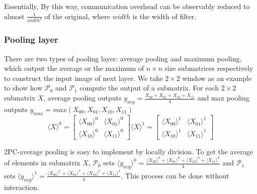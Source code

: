 \documentclass[letterpaper]{article} %
\begin{document}
    Essentially, 
    By this way, communication overhead can be observably reduced to almost $ \frac{1}{width^{2}} $ of the original, 
    where $width$ is the width of filter. 
    
    
    \subsubsection{Pooling layer}
    
    
    There are two types of pooling layer: average pooling and maximum pooling, 
    which output the average or the maximum of $n\times n$ size submatrices respectively
    to construct the input image of next layer. 
    We take $2\times 2$ window as an example to show how $\mathcal{P}_{0}$ and $\mathcal{P}_{1}$ compute the output of a submatrix.
    For each $2\times 2$ submatrix $X$, average pooling outputs $y_{avg}=\frac{X_{00}+ X_{01}+ X_{10}+  X_{11}}{4}$
    and max pooling outputs $y_{max}=max(X_{00}, X_{01}, X_{10},  X_{11})$
    $$  \langle X\rangle ^{0}= \begin{bmatrix}
        \langle X_{00}\rangle ^{0}& \langle X_{01}\rangle ^{0} \\ 
        \langle X_{10}\rangle ^{0}& \langle X_{11}\rangle ^{0}
       \end{bmatrix}\langle X\rangle ^{1}=\begin{bmatrix}
        \langle X_{00}\rangle ^{1}& \langle X_{01}\rangle ^{1} \\ 
        \langle X_{10}\rangle ^{1}& \langle X_{11}\rangle ^{1}
       \end{bmatrix}$$
    
    
    
    2PC-average pooling is easy to implement by locally division.
    To get the average of elements in submatrix $X$, 
    $\mathcal{P}_{0}$ sets $\langle y_{avg}\rangle^{0} =$$ \frac{\langle X_{00}\rangle ^{0}+ \langle X_{01}\rangle ^{0}+
    \langle X_{10}\rangle ^{0}+ \langle X_{11}\rangle ^{0}}{4}$ and 
    $\mathcal{P}_{1}$ sets $\langle y_{avg}\rangle^{1} = \frac{\langle X_{00}\rangle ^{1}+ \langle X_{01}\rangle ^{1}+
    \langle X_{10}\rangle ^{1}+ \langle X_{11}\rangle ^{1}}{4}$. This process can be done without interaction.
    
\end{document}
